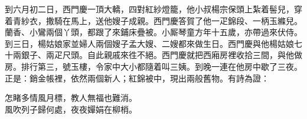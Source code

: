 到六月初二日，西門慶一頂大轎，四對紅紗燈籠，他小叔楊宗保頭上紮着髻兒，穿着青紗衣，撒騎在馬上，送他嫂子成親。西門慶答賀了他一疋錦段、一柄玉縧兒。蘭香、小鸞兩個丫頭，都跟了來鋪床疊被。小厮琴童方年十五歲，亦帶過來伏侍。到三日，楊姑娘家並婦人兩個嫂子孟大嫂、二嫂都來做生日。西門慶與他楊姑娘七十兩銀子、兩疋尺頭。自此親戚來徃不絕。西門慶就把西廂房裡收拾三間，與他做房。排行第三，號玉樓，令家中大小都隨着叫三姨。到晚一連在他房中歇了三夜。正是：銷金帳裡，依然兩個新人；紅錦被中，現出兩般舊物。有詩為證：

\begin{myquote} 
怎睹多情風月標，教人無福也難消。\\風吹列子歸何處，夜夜嬋娟在柳梢。
\end{myquote} 

